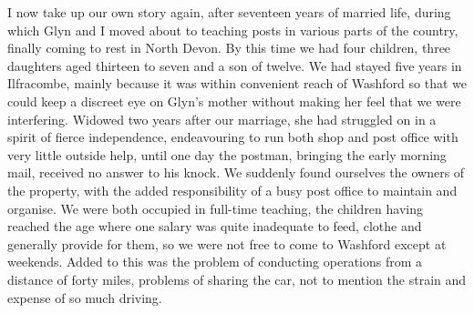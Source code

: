 
I now take up our own story again, after seventeen years of married life, during which Glyn and I moved about to teaching posts in various parts of the country, finally coming to rest in North Devon. By this time we had four children, three daughters aged thirteen to seven and a son of twelve. We had stayed five years in Ilfracombe, mainly because it was within convenient reach of Washford so that we could keep a discreet eye on Glyn's mother without making her feel that we were interfering. Widowed two years after our marriage, she had struggled on in a spirit of fierce independence, endeavouring to run both shop and post office with very little outside help, until one day the postman, bringing the early morning mail, received no answer to his knock. We suddenly found ourselves the owners of the property, with the added responsibility of a busy post office to maintain and organise. We were both occupied in full-time teaching, the children having reached the age where one salary was quite inadequate to feed, clothe and generally provide for them, so we were not free to come to Washford except at weekends. Added to this was the problem of conducting operations from a distance of forty miles, problems of sharing the car, not to mention the strain and expense of so much driving.

